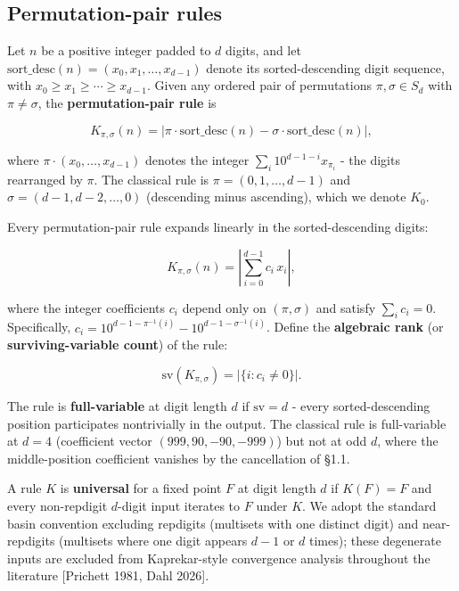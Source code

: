 \documentclass[11pt,letterpaper]{article}
\theoremstyle{paperstyle}
\theoremstyle{paperstyledef}
\theoremstyle{paperstylerem}
\begin{document}
\hypertarget{permutation-pair-rules}{%
\subsection{Permutation-pair rules}\label{permutation-pair-rules}}

Let \(n\) be a positive integer padded to \(d\) digits, and let
\(\mathrm{sort\_desc}(n) = (x_0, x_1, \ldots, x_{d-1})\) denote its
sorted-descending digit sequence, with
\(x_0 \geq x_1 \geq \cdots \geq x_{d-1}\). Given any ordered pair of
permutations \(\pi, \sigma \in S_d\) with \(\pi \neq \sigma\), the
\textbf{permutation-pair rule} is

\[K_{\pi, \sigma}(n) = \bigl| \pi \cdot \mathrm{sort\_desc}(n) - \sigma \cdot \mathrm{sort\_desc}(n) \bigr|,\]

where \(\pi \cdot (x_0, \ldots, x_{d-1})\) denotes the integer
\(\sum_{i} 10^{d-1-i} x_{\pi_i}\) - the digits rearranged by \(\pi\).
The classical rule is \(\pi = (0, 1, \ldots, d-1)\) and
\(\sigma = (d-1, d-2, \ldots, 0)\) (descending minus ascending), which
we denote \(K_0\).

Every permutation-pair rule expands linearly in the sorted-descending
digits:

\[K_{\pi, \sigma}(n) = \left| \sum_{i=0}^{d-1} c_i \, x_i \right|,\]

where the integer coefficients \(c_i\) depend only on \((\pi, \sigma)\)
and satisfy \(\sum_i c_i = 0\). Specifically,
\(c_i = 10^{d-1-\pi^{-1}(i)} - 10^{d-1-\sigma^{-1}(i)}\). Define the
\textbf{algebraic rank} (or \textbf{surviving-variable count}) of the
rule:

\[\mathrm{sv}(K_{\pi, \sigma}) = \bigl|\{ i : c_i \neq 0 \}\bigr|.\]

The rule is \textbf{full-variable} at digit length \(d\) if
\(\mathrm{sv} = d\) - every sorted-descending position participates
nontrivially in the output. The classical rule is full-variable at
\(d = 4\) (coefficient vector \((999, 90, -90, -999)\)) but not at odd
\(d\), where the middle-position coefficient vanishes by the
cancellation of §1.1.

A rule \(K\) is \textbf{universal} for a fixed point \(F\) at digit
length \(d\) if \(K(F) = F\) and every non-repdigit \(d\)-digit input
iterates to \(F\) under \(K\). We adopt the standard basin convention
excluding repdigits (multisets with one distinct digit) and
near-repdigits (multisets where one digit appears \(d - 1\) or \(d\)
times); these degenerate inputs are excluded from Kaprekar-style
convergence analysis throughout the literature {[}Prichett 1981, Dahl
2026{]}.
\end{document}
